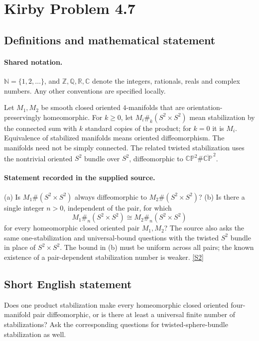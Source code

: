 \documentclass[11pt]{article}
\newcommand{\sref}[2]{\hyperlink{source:#1:#2}{[S#2]}}
\begin{document}
\section{Kirby Problem 4.7}\label{statement}

\subsection{Definitions and mathematical statement}

\paragraph{Shared notation.}$\mathbb N=\{1,2,\ldots\}$, and $\mathbb Z,\mathbb Q,\mathbb R,\mathbb C$ denote the integers, rationals, reals and complex numbers. Any other conventions are specified locally.


Let $M_1,M_2$ be smooth closed oriented $4$-manifolds that are orientation-preservingly homeomorphic. For $k\ge0$, let $M_i\#_k(S^2\times S^2)$ mean stabilization by the connected sum with $k$ standard copies of the product; for $k=0$ it is $M_i$. Equivalence of stabilized manifolds means oriented diffeomorphism. The manifolds need not be simply connected. The related twisted stabilization uses the nontrivial oriented $S^2$ bundle over $S^2$, diffeomorphic to $\mathbb{CP}^2\#\overline{\mathbb{CP}}^{\,2}$.
\paragraph{Statement recorded in the supplied source.}
(a) Is $M_1\#(S^2\times S^2)$ always diffeomorphic to $M_2\#(S^2\times S^2)$? (b) Is there a single integer $n>0$, independent of the pair, for which
\[
M_1\#_n(S^2\times S^2)\cong M_2\#_n(S^2\times S^2)
\]
for every homeomorphic closed oriented pair $M_1,M_2$? The source also asks the same one-stabilization and universal-bound questions with the twisted $S^2$ bundle in place of $S^2\times S^2$. The bound in (b) must be uniform across all pairs; the known existence of a pair-dependent stabilization number is weaker. \sref{statement}{2}
\subsection{Short English statement}
Does one product stabilization make every homeomorphic closed oriented four-manifold pair diffeomorphic, or is there at least a universal finite number of stabilizations? Ask the corresponding questions for twisted-sphere-bundle stabilization as well.
\end{document}
